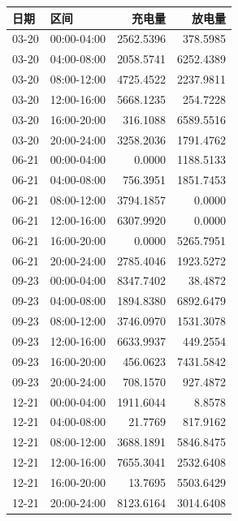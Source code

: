 \begin{tabular}{llrr}
\toprule
日期 & 区间 & 充电量 & 放电量 \\
\midrule
03-20 & 00:00-04:00 & 2562.5396 & 378.5985 \\
03-20 & 04:00-08:00 & 2058.5741 & 6252.4389 \\
03-20 & 08:00-12:00 & 4725.4522 & 2237.9811 \\
03-20 & 12:00-16:00 & 5668.1235 & 254.7228 \\
03-20 & 16:00-20:00 & 316.1088 & 6589.5516 \\
03-20 & 20:00-24:00 & 3258.2036 & 1791.4762 \\
06-21 & 00:00-04:00 & 0.0000 & 1188.5133 \\
06-21 & 04:00-08:00 & 756.3951 & 1851.7453 \\
06-21 & 08:00-12:00 & 3794.1857 & 0.0000 \\
06-21 & 12:00-16:00 & 6307.9920 & 0.0000 \\
06-21 & 16:00-20:00 & 0.0000 & 5265.7951 \\
06-21 & 20:00-24:00 & 2785.4046 & 1923.5272 \\
09-23 & 00:00-04:00 & 8347.7402 & 38.4872 \\
09-23 & 04:00-08:00 & 1894.8380 & 6892.6479 \\
09-23 & 08:00-12:00 & 3746.0970 & 1531.3078 \\
09-23 & 12:00-16:00 & 6633.9937 & 449.2554 \\
09-23 & 16:00-20:00 & 456.0623 & 7431.5842 \\
09-23 & 20:00-24:00 & 708.1570 & 927.4872 \\
12-21 & 00:00-04:00 & 1911.6044 & 8.8578 \\
12-21 & 04:00-08:00 & 21.7769 & 817.9162 \\
12-21 & 08:00-12:00 & 3688.1891 & 5846.8475 \\
12-21 & 12:00-16:00 & 7655.3041 & 2532.6408 \\
12-21 & 16:00-20:00 & 13.7695 & 5503.6429 \\
12-21 & 20:00-24:00 & 8123.6164 & 3014.6408 \\
\bottomrule
\end{tabular}
